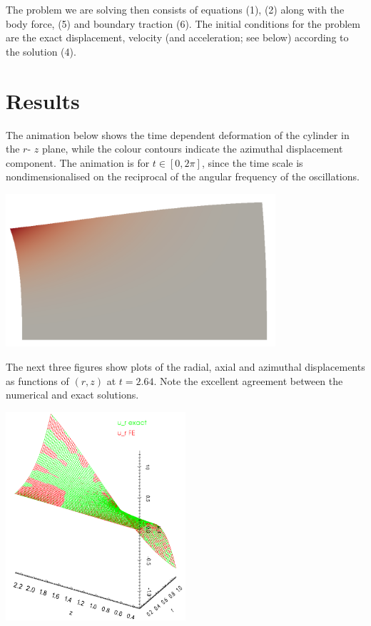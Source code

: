 The problem we are solving then consists of equations (1), (2) along with the body force, (5) and boundary traction (6). The initial conditions for the problem are the exact displacement, velocity (and acceleration; see below) according to the solution (4).\hypertarget{index_results}{}\section{Results}\label{index_results}
The animation below shows the time dependent deformation of the cylinder in the $ r $-\/ $ z $ plane, while the colour contours indicate the azimuthal displacement component. The animation is for $ t \in [0,2\pi] $, since the time scale is nondimensionalised on the reciprocal of the angular frequency of the oscillations.

 
\begin{DoxyImage}
\includegraphics[width=0.75\textwidth]{a}
\end{DoxyImage}
 The next three figures show plots of the radial, axial and azimuthal displacements as functions of $ (r,z) $ at $ t = 2.64 $. Note the excellent agreement between the numerical and exact solutions.  
\begin{DoxyImage}
\includegraphics[width=0.5\textwidth]{u_r}
\end{DoxyImage}
  
